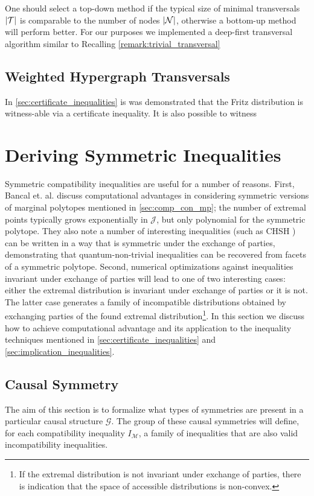 \documentclass[aps, 10pt, english, twoside, pra, nofootinbib, longbibliography]{revtex4-1}
\theoremstyle{plain}
\theoremstyle{definition}
\theoremstyle{remark}
\newcommand{\graph}{\mathcal{G}}
\newcommand{\nodes}{\mathcal{N}}
\newcommand{\trans}{\mathcal{T}}
\newcommand{\mscenario}{\mathcal{M}}
\newcommand{\jointvar}{\mathcal{J}}
\begin{document}
    One should select a top-down method if the typical size of minimal transversals $\abs{\trans}$ is comparable to the number of nodes $\abs{\nodes}$, otherwise a bottom-up method will perform better.
    For our purposes we implemented a deep-first transversal algorithm similar to
    Recalling \cref{remark:trivial_transversal}

    \subsection{Weighted Hypergraph Transversals}
    In \cref{sec:certificate_inequalities} is was demonstrated that the Fritz distribution is witness-able via a certificate inequality. It is also possible to witness

    \section{Deriving Symmetric Inequalities}
    \label{sec:symmetry}
    Symmetric compatibility inequalities are useful for a number of reasons. First, Bancal et. al. \cite{Bancal_2010} discuss computational advantages in considering symmetric versions of marginal polytopes mentioned in \cref{sec:comp_con_mp}; the number of extremal points typically grows exponentially in $\jointvar$, but only polynomial for the symmetric polytope. They also note a number of interesting inequalities (such as CHSH \cite{CHSH_Original}) can be written in a way that is symmetric under the exchange of parties, demonstrating that quantum-non-trivial inequalities can be recovered from facets of a symmetric polytope. Second, numerical optimizations against inequalities invariant under exchange of parties will lead to one of two interesting cases: either the extremal distribution is invariant under exchange of parties or it is not. The latter case generates a family of incompatible distributions obtained by exchanging parties of the found extremal distribution\footnote{If the extremal distribution is not invariant under exchange of parties, there is indication that the space of accessible distributions is non-convex.}. In this section we discuss how to achieve computational advantage and its application to the inequality techniques mentioned in \cref{sec:certificate_inequalities} and \cref{sec:implication_inequalities}.
    \subsection{Causal Symmetry}
    The aim of this section is to formalize what types of symmetries are present in a particular causal structure $\graph$. The group of these causal symmetries will define, for each compatibility inequality $I_{\mscenario}$, a family of inequalities that are also valid incompatibility inequalities.
\end{document}
